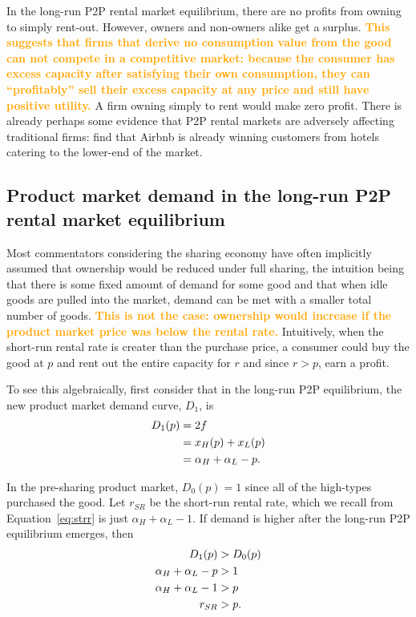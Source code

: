 \documentclass[11pt]{article}
\newcommand{\important}[1]{\textcolor{orange}{\textbf{#1}}}
\newcommand{\important}[1]{#1}
\begin{document}
In the long-run P2P rental market equilibrium, there are no profits from owning to simply rent-out. 
However, owners and non-owners alike get a surplus. 
\important{This suggests that firms that derive no consumption value from the good can not compete in a competitive market: 
because the consumer has excess capacity after satisfying their own consumption, they can ``profitably'' sell their excess capacity at any price and still have positive utility.} 
A firm owning simply to rent would make zero profit. 
There is already perhaps some evidence that P2P rental markets are adversely affecting traditional firms: 
\cite{byers2013rise} find that Airbnb is already winning customers from hotels catering to the lower-end of the market. 


\subsection{Product market demand in the long-run P2P rental market equilibrium} 
Most commentators considering the sharing economy have often implicitly assumed that ownership would be reduced under full sharing, the intuition being that there is some fixed amount of demand for some good and that when idle goods are pulled into the market, demand can be met with a smaller total number of goods. 
\important{This is not the case:  
ownership would increase if the product market price was below the rental rate.} 
Intuitively, when the short-run rental rate is creater than the purchase price, a consumer could buy the good at $p$ and rent out the entire capacity for $r$ and since $r > p$, earn a profit. 

To see this algebraically, first consider that in the long-run P2P equilibrium, the new product market demand curve, $D_1$, is
\begin{align}
D_1(p) &= 2f \notag \\  
     &= x_H(p) + x_L(p) \notag \\ 
     &= \alpha_H + \alpha_L - p.  
\end{align} 

In the pre-sharing product market, $D_0(p) = 1$ since all of the high-types purchased the good. 
Let $r_{SR}$ be the short-run rental rate, which we recall from Equation~\ref{eq:strr} is just $\alpha_H + \alpha_L - 1$. 
If demand is higher after the long-run P2P equilibrium emerges, then  
\begin{align} 
D_{1}(p) & > D_{0}(p) \notag \\
\alpha_H + \alpha_L - p &> 1 \notag \\ 
\alpha_H + \alpha_L - 1 &> p \notag \\ 
r_{SR} &>  p. 
\end{align} 
\end{document}

